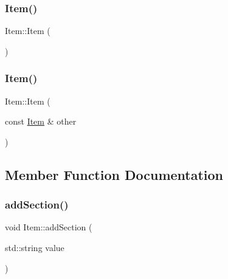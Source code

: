 \mbox{\label{class_item_a297720c02984eab37332ae795d22189d}} 
\subsubsection{\texorpdfstring{Item()}{Item()}\hspace{0.1cm}{\footnotesize\ttfamily [4/5]}}
{\footnotesize\ttfamily Item\+::\+Item (\begin{DoxyParamCaption}{ }\end{DoxyParamCaption})}

\mbox{\label{class_item_a44f7e3f580bd6c0fa2e1c288dff484be}} 
\subsubsection{\texorpdfstring{Item()}{Item()}\hspace{0.1cm}{\footnotesize\ttfamily [5/5]}}
{\footnotesize\ttfamily Item\+::\+Item (\begin{DoxyParamCaption}\item[{const \mbox{\hyperlink{class_item}{Item}} \&}]{other }\end{DoxyParamCaption})}



\subsection{Member Function Documentation}
\mbox{\label{class_item_a6c9f73ef36b176cdb75bc9b13d5be8e8}} 
\subsubsection{\texorpdfstring{add\+Section()}{addSection()}}
{\footnotesize\ttfamily void Item\+::add\+Section (\begin{DoxyParamCaption}\item[{std\+::string}]{value }\end{DoxyParamCaption})}

